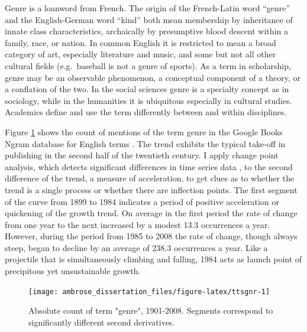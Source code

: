 \documentclass[]{book}
\theoremstyle{definition}
\theoremstyle{definition}
\theoremstyle{definition}
\theoremstyle{remark}
\begin{document}
Genre is a loanword from French. The origin of the French-Latin word
``genre'' and the English-German word ``kind'' both mean membership by
inheritance of innate class characteristics, archaically by presumptive
blood descent within a family, race, or nation. In common English it is
restricted to mean a broad category of art, especially literature and
music, and some but not all other cultural fields (e.g.~baseball is not
a genre of sports). As a term in scholarship, genre may be an observable
phenomenon, a conceptual component of a theory, or a conflation of the
two. In the social sciences genre is a specialty concept as in
sociology, while in the humanities it is ubiquitous especially in
cultural studies. Academics define and use the term differently between
and within disciplines.

Figure \ref{fig:ttsgnr} shows the count of mentions of the term genre in
the Google Books Ngram database for English terms
\citep{Michel2011Quantitative}. The trend exhibits the typical take-off
in publishing in the second half of the twentieth century. I apply
change point analysis, which detects significant differences in time
series data \citep{Matteson2013Nonparametric, James2019ecp}, to the
second difference of the trend, a measure of acceleration, to get clues
as to whether the trend is a single process or whether there are
inflection points. The first segment of the curve from 1899 to 1984
indicates a period of positive acceleration or quickening of the growth
trend. On average in the first period the rate of change from one year
to the next increased by a modest 13.3 occurrences a year. However,
during the period from 1985 to 2008 the rate of change, though always
steep, began to decline by an average of 238.3 occurrences a year. Like
a projectile that is simultaneously climbing and falling, 1984 acts as
launch point of precipitous yet unsustainable growth.

\begin{figure}

{\centering \texttt{[image: ambrose\_dissertation\_files/figure-latex/ttsgnr-1]} 

}

\caption{Absolute count of term "genre", 1901-2008. Segments correspond to significantly different second derivatives.}\label{fig:ttsgnr}
\end{figure}
\end{document}
